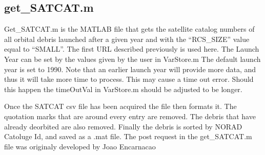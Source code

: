 \documentclass[12pt]{article}
\begin{document}
		\subsection{get\_SATCAT.m}
		Get\_SATCAT.m is the MATLAB file that gets the satellite catalog  numbers of all orbital debris launched after a given year and with the “RCS\_SIZE” value equal to “SMALL”. The first URL described previously is used here. The Launch Year can be set by the values given by the user in VarStore.m The default launch year is set to 1990. Note that an earlier launch year will provide more data, and thus it will take more time to process. This may cause a time out error. Should this happen the timeOutVal in VarStore.m should be adjusted to be longer.\par 
		Once the SATCAT csv file has been acquired the file then formats it. The quotation marks that are around every entry are removed. The debris that have already deorbited are also removed. Finally the debris is sorted by NORAD Catoluge Id, and saved as a .mat file.
		The post request in the get\_SATCAT.m file was originaly developed by Joao Encarnacao\cite{codeGETtle}

		
\end{document}
